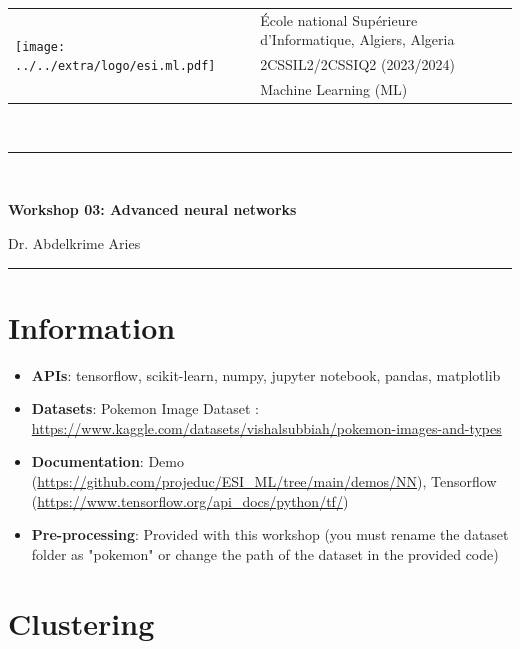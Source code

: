 \documentclass[11pt, a4paper]{article}
\begin{document}

\noindent
\begin{tabular}{ll}
	\multirow{3}{*}{\texttt{[image: ../../extra/logo/esi.ml.pdf]}} & \'Ecole national Supérieure d'Informatique, Algiers, Algeria\\
	& 2CSSIL2/2CSSIQ2 (2023/2024)\\
	& Machine Learning (ML)
\end{tabular}\\[.25cm]
\noindent\rule{\textwidth}{1pt}\\[-0.5cm]
\begin{center}
	{\LARGE \textbf{Workshop 03: Advanced neural networks}}
	\begin{flushright}
		Dr. Abdelkrime Aries
	\end{flushright}
\end{center}\vspace{-.25cm}
\noindent\rule{\textwidth}{1pt}

\section*{Information}

\begin{itemize}
	\item \textbf{APIs}: tensorflow, scikit-learn, numpy, jupyter notebook, pandas, matplotlib
	\item \textbf{Datasets}: Pokemon Image Dataset : {\scriptsize\url{https://www.kaggle.com/datasets/vishalsubbiah/pokemon-images-and-types}}
	\item \textbf{Documentation}: Demo ({\scriptsize \url{https://github.com/projeduc/ESI_ML/tree/main/demos/NN}}), Tensorflow ({\scriptsize \url{https://www.tensorflow.org/api_docs/python/tf/}})
	\item \textbf{Pre-processing}: Provided with this workshop (you must rename the dataset folder as "pokemon" or change the path of the dataset in the provided code)
\end{itemize}

\section{Clustering}
\end{document}
